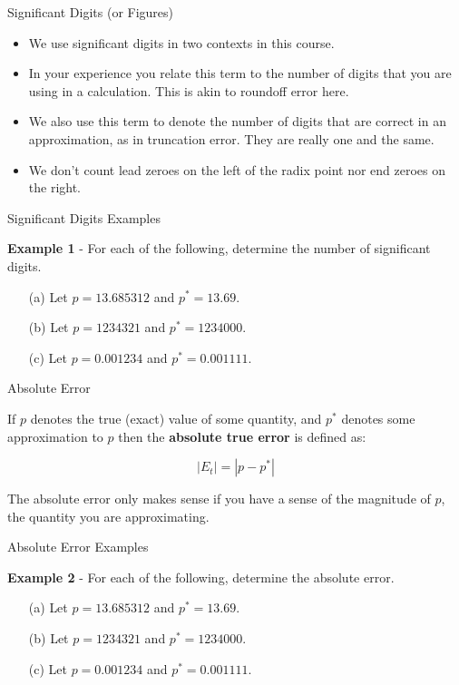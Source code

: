 \documentclass[12pt]{beamer}
\begin{document}
\begin{frame}{Significant Digits (or Figures)}
\begin{itemize}
\item{We use significant digits in two contexts in this course.}
\item{In your experience you relate this term to the number of digits that you are using in a calculation. This is akin to roundoff error here.}
\item{We also use this term to denote the number of digits that are correct in an approximation, as in truncation error. They are really one and the same.}
\item{We don't count lead zeroes on the left of the radix point nor end zeroes on the right.}
\end{itemize}
\end{frame}

\begin{frame}{Significant Digits Examples}

{\bf Example 1} - For each of the following, determine the number of significant digits.
\begin{enumerate}
\item[(a)]{Let $p=13.685312$ and $p^*=13.69$.}
\vspace{0.5 in}
\item[(b)]{Let $p=1234321$ and $p^*=1234000$.} 
\vspace{0.5 in}
\item[(c)]{Let $p=0.001234$ and $p^*=0.001111$.}
\vspace{0.5 in}
\end{enumerate}
\end{frame}


\begin{frame}{Absolute Error}

If $p$ denotes the true (exact) value of some quantity, and $p^{*}$
denotes some approximation to $p$ then the {\bf absolute true error}
is defined as:

\begin{equation} 
|E_{t}| = | p - p ^{*}|
\end{equation} 

The absolute error only makes sense if you have a sense of the
magnitude of $p$, the quantity you are approximating.


\end{frame}

\begin{frame}{Absolute Error Examples}

{\bf Example 2} - For each of the following, determine the absolute error.
\begin{enumerate}
\item[(a)]{Let $p=13.685312$ and $p^*=13.69$.}
\vspace{0.5 in}
\item[(b)]{Let $p=1234321$ and $p^*=1234000$.} 
\vspace{0.5 in}
\item[(c)]{Let $p=0.001234$ and $p^*=0.001111$.}
\vspace{0.5 in}
\end{enumerate}
\end{frame}
\end{document}
